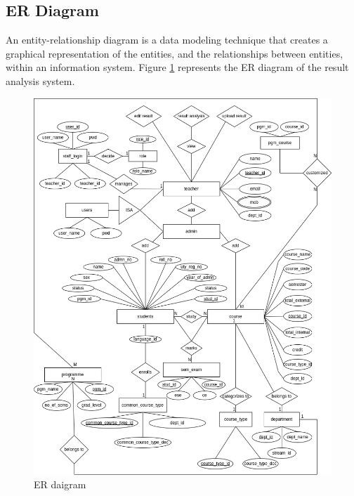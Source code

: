 \documentclass{nascproject}
\begin{document}
\subsection{ER Diagram}
An entity-relationship diagram is a data modeling technique that creates a graphical
representation of the entities, and the relationships between entities, within an information
system. Figure \ref{er} represents the ER diagram of the result analysis system.\\
\begin{figure}[H]
	\centering
	\includegraphics[width=1\linewidth]{er.png}
	\caption{ER daigram}
	\label{er}
\end{figure}
\break
\end{document}
